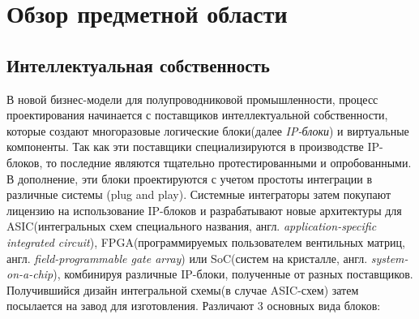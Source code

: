 \section{Обзор предметной области}
\label{sec:domain}


\subsection{Интеллектуальная собственность}
\label{sub:domain:ip}
В новой бизнес-модели для полупроводниковой промышленности, процесс проектирования начинается с поставщиков интеллектуальной собственности, которые создают многоразовые
логические блоки(далее \textit{IP-блоки}) и виртуальные компоненты. Так как эти поставщики специализируются в производстве IP-блоков, то последние являются тщательно протестированными и опробованными. В дополнение, эти блоки проектируются с учетом простоты интеграции в различные системы (plug and play). Системные интеграторы затем покупают лицензию на использование IP-блоков и разрабатывают новые архитектуры для ASIC(интегральных схем специального названия, англ. \textit{application-specific integrated circuit}), FPGA(программируемых пользователем вентильных матриц, англ. \textit{field-programmable gate array}) или SoC(систем на кристалле, англ. \textit{system-on-a-chip}), комбинируя различные IP-блоки, полученные от разных поставщиков. Получившийся дизайн интегральной схемы(в случае ASIC-схем) затем посылается на завод для изготовления.
Различают 3 основных вида блоков\cite{conterfeit_integrated_circuits}:

